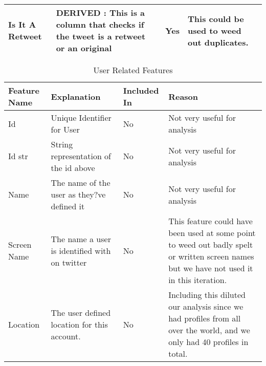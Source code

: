 \begin{landscape}
\begin{longtable}{|C{1.00in}|C{2.50in}|C{.60in}|C{5.00in}|}
\hline
Is It A Retweet & DERIVED : This is a column that checks if the tweet is a retweet or an original & Yes & This could be used to weed out duplicates.\\  
\hline                                                                                                                                                                                                            
\bottomrule[1.25pt]
\end{longtable}
\label{tab:LPer}
\end{landscape}

\begin{landscape}
\centering
\begin{longtable}{|C{1.00in}|C{2.50in}|C{.60in}|C{5.00in}|}
\caption{User Related Features} \\
\toprule[1.5pt]
Feature Name  & Explanation & Included In & Reason  \\\midrule
Id   & Unique Identifier for User                                                                                                     & No          & Not very useful for analysis                                                                                                                                                                     \\
\hline    
Id str & String representation of the id above                                                                                          & No          & Not very useful for analysis                                                                                                                                                                     \\
\hline    
Name & The name of the user as they?ve defined it                                                                                     & No          & Not very useful for analysis                                                                                                                                                                     \\
\hline    
Screen Name  & The name a user is identified with on twitter                                                                                  & No          & This feature could have been used at some point to weed out badly spelt or written screen names but we have not used it in this iteration.                                                       \\
\hline    
Location  & The user defined location for this account.                                                                                    & No          & Including this diluted our analysis since we had profiles from all over the world, and we only had 40 profiles in total.                                                                         \\

\end{longtable}
\end{landscape}
